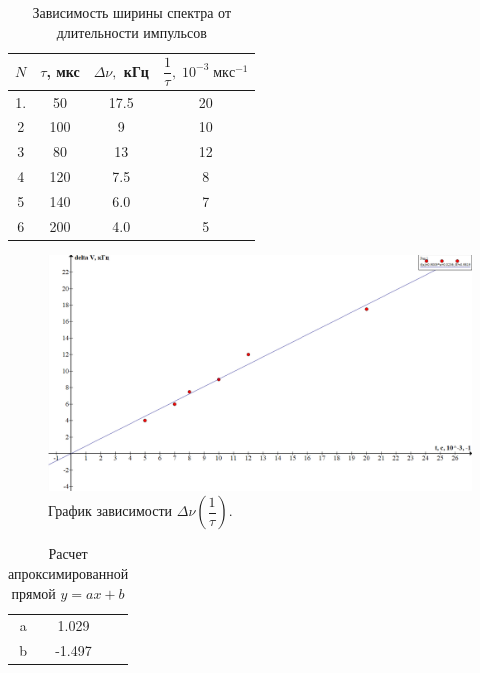   	\begin{table}[]
  		\caption{Зависимость ширины спектра от длительности импульсов}
  		\begin{center}
  			\begin{tabular}{|c|c|c|c|}
  			\hline
  			$ N $ & $ \tau $, мкс & $ \Delta\nu, $ кГц  & $ \dfrac{1}{\tau}, \; 10^{-3} \; мкс^{-1}$ \\
  			\hline
  			1. & 50 & 17.5 & 20 \\
  				\hline
  			2 & 100 & 9 & 10 \\
  				\hline
  			3 & 80 & 13 & 12 \\
  				\hline
  			4 & 120 & 7.5 & 8 \\
  				\hline
  			5 & 140 & 6.0 & 7 \\
  				\hline
  			6 & 200 & 4.0 & 5 \\
  				\hline
  			\end{tabular}
  		\end{center}
  	\label{A_table}
  	\end{table}
  	
  	\begin{figure}[h!]
  		\label{A_graf}
  		\includegraphics[scale=0.47]{pics/lab361_v1.png}
  		\caption{График зависимости $ \Delta \nu \left (\dfrac{1}{\tau} \right ) $. }
  	\end{figure}
  	

  	\begin{table}[h!]
  		\centering
  		\caption{Расчет апроксимированной прямой $ y = ax +b $}
  		\begin{tabular}{c|cc}
  			\text{} & \text{Estimate} & \\
  			\hline
  			a  & 1.029 & \\
  			b  & -1.497 &  \\
  			\hline
  		\end{tabular}
  	\end{table}
  	
